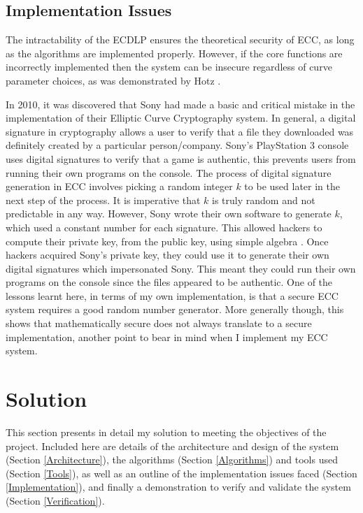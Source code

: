 \documentclass[12pt,a4paper]{article}
\begin{document}
\subsection{Implementation Issues} \noindent
The intractability of the ECDLP ensures the theoretical security of ECC, 
as long as the algorithms are implemented properly. 
However, if the core functions are incorrectly implemented then the system can be insecure regardless of curve parameter choices, 
as was demonstrated by Hotz \citeyear{hotz2010console}. 

In 2010, it was discovered that Sony had made a basic and critical mistake in the implementation of their Elliptic Curve Cryptography system. 
In general, a digital signature in cryptography allows a user to verify that a file they downloaded was definitely created by a particular person/company. 
Sony's PlayStation 3 console uses digital signatures to verify that a game is authentic, 
this prevents users from running their own programs on the console. 
The process of digital signature generation in ECC involves picking a random integer $k$ to be used later in the next step of the process. 
It is imperative that $k$ is truly random and not predictable in any way. 
However, Sony wrote their own software to generate $k$, which used a constant number for each signature. 
This allowed hackers to compute their private key, from the public key, using simple algebra \cite{hotz2010console}. 
Once hackers acquired Sony's private key, they could use it to generate their own digital signatures which impersonated Sony. 
This meant they could run their own programs on the console since the files appeared to be authentic. 
One of the lessons learnt here, in terms of my own implementation, 
is that a secure ECC system requires a good random number generator. 
More generally though, this shows that mathematically secure does not always translate to a secure implementation, 
another point to bear in mind when I implement my ECC system. 



\section{Solution} \noindent
This section presents in detail my solution to meeting the objectives of the project. 
Included here are details of the architecture and design of the system (Section \ref{Architecture}), 
the algorithms (Section \ref{Algorithms}) and tools used (Section \ref{Tools}), 
as well as an outline of the implementation issues faced (Section \ref{Implementation}), 
and finally a demonstration to verify and validate the system (Section \ref{Verification}). 
\end{document}
